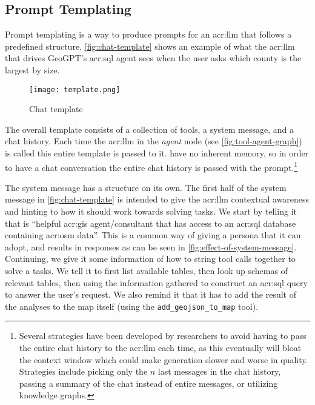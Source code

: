 \subsection{Prompt Templating}
\label{subsec:prompt-templating}

Prompt templating is a way to produce prompts for an \acrshort{acr:llm} that follows a predefined structure. \autoref{fig:chat-template} shows an example of what the \acrshort{acr:llm} that drives GeoGPT's \acrshort{acr:sql} agent sees when the user asks which county is the largest by size.

\begin{figure}
    \centering
    \texttt{[image: template.png]}
    \caption{Chat template}
    \label{fig:chat-template}
\end{figure}

The overall template consists of a collection of tools, a system message, and a chat history. Each time the \acrshort{acr:llm} in the \textit{agent} node (see \autoref{fig:tool-agent-graph}) is called this entire template is passed to it.  have no inherent memory, so in order to have a chat conversation the entire chat history is passed with the prompt.\footnote{Several strategies have been developed by researchers to avoid having to pass the entire chat history to the \acrshort{acr:llm} each time, as this eventually will bloat the context window which could make generation slower and worse in quality. Strategies include picking only the $n$ last messages in the chat history, passing a summary of the chat instead of entire messages, or utilizing knowledge graphs.}

The system message has a structure on its own. The first half of the system message in \autoref{fig:chat-template} is intended to give the \acrshort{acr:llm} contextual awareness and hinting to how it should work towards solving tasks. We start by telling it that is \enquote{helpful \acrshort{acr:gis} agent/consultant that has access to an \acrshort{acr:sql} database containing \acrlong{acr:osm} data}. This is a common way of giving  a persona that it can adopt, and results in responses as can be seen in \autoref{fig:effect-of-system-message}.  Continuing, we give it some information of how to string tool calls together to solve a tasks. We tell it to first list available tables, then look up schemas of relevant tables, then using the information gathered to construct an \acrshort{acr:sql} query to answer the user's request. We also remind it that it has to add the result of the analyses to the map itself (using the \texttt{add\_geojson\_to\_map} tool).

